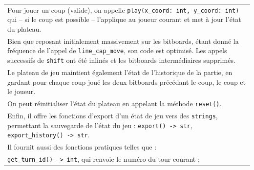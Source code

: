 \documentclass[a4paper,12pt]{article}
\begin{document}
\begin{tabularx}{\textwidth}{|X|}
    Pour jouer un coup (valide), on appelle \texttt{play(x\_coord: int, y\_coord: int)} qui -- si le coup est possible -- l’applique au joueur courant et met à jour l’état du plateau.                                                                                                                                                                                                      \\
    Bien que reposant initialement massivement sur les bitboards, étant donné la fréquence de l’appel de \texttt{line\_cap\_move}, son code est optimisé. Les appels successifs de \texttt{shift} ont été inlinés et les bitboards intermédiaires supprimés.                                                                                                                                 \\
    Le plateau de jeu maintient également l’état de l’historique de la partie, en gardant pour chaque coup joué les deux bitboards précédant le coup, le coup et le joueur.                                                                                                                                                                                                                  \\
    On peut réinitialiser l’état du plateau en appelant la méthode \texttt{reset()}.                                                                                                                                                                                                                                                                                                         \\
    Enfin, il offre les fonctions d’export d’un état de jeu vers des \texttt{strings}, permettant la sauvegarde de l’état du jeu : \texttt{export() -> str}, \texttt{export\_history() -> str}.                                                                                                                                                                                              \\
    Il fournit aussi des fonctions pratiques telles que :                                                                                                                                                                                                                                                                                                                                    \\
    \texttt{get\_turn\_id() -> int}, qui renvoie le numéro du tour courant ;                                                                                                                                                                                                                                                                                                                 \\

\end{tabularx}
\end{document}
